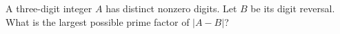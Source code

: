A three-digit integer $A$ has distinct nonzero digits. Let $B$ be its digit reversal. What is the largest possible prime factor of $|A-B|$?

